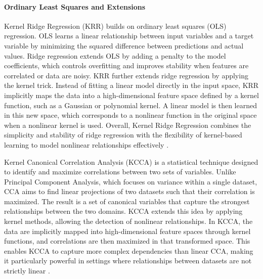 \paragraph{Ordinary Least Squares and Extensions}
\label{sec:background_ml_lr}
Kernel Ridge Regression (KRR) builds on ordinary least squares (OLS) regression. OLS learns a linear relationship between input variables and a target variable by minimizing the squared difference between predictions and actual values. Ridge regression extends OLS by adding a penalty to the model coefficients, which controls overfitting and improves stability when features are correlated or data are noisy.
KRR further extends ridge regression by applying the kernel trick. Instead of fitting a linear model directly in the input space, KRR implicitly maps the data into a high-dimensional feature space defined by a kernel function, such as a Gaussian or polynomial kernel. A linear model is then learned in this new space, which corresponds to a nonlinear function in the original space when a nonlinear kernel is used.
Overall, Kernel Ridge Regression combines the simplicity and stability of ridge regression with the flexibility of kernel-based learning to model nonlinear relationships effectively \cite{scikit_linear_2025}.

\label{sec:background_ml_kcca}
\noindent
Kernel Canonical Correlation Analysis (KCCA) is a statistical technique designed to identify and maximize correlations between two sets of variables. Unlike Principal Component Analysis, which focuses on variance within a single dataset, CCA aims to find linear projections of two datasets such that their correlation is maximized. The result is a set of canonical variables that capture the strongest relationships between the two domains. KCCA extends this idea by applying kernel methods, allowing the detection of nonlinear relationships. In KCCA, the data are implicitly mapped into high-dimensional feature spaces through kernel functions, and correlations are then maximized in that transformed space. This enables KCCA to capture more complex dependencies than linear CCA, making it particularly powerful in settings where relationships between datasets are not strictly linear \cite{1202783} \cite{5644899} \cite{cca_zoo_kcca_2025}.

